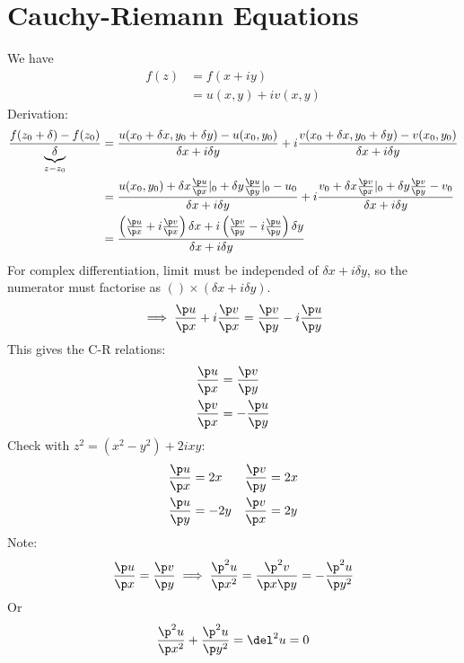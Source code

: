 \documentclass[a4paper, 11pt, normalem]{report}
\begin{document}
\section{Cauchy-Riemann Equations}
We have
\begin{align}
    f(z) &= f(x + iy) \\
         &= u(x,y) + iv(x,y)
\end{align}
Derivation:
\begin{align}
    \frac{f(z_0 + \delta) - f(z_0)}{\underbrace{\delta}_{z - z_0}} &= \frac{u(x_0 + \delta x, y_0 + \delta y) - u(x_0,y_0)}{\delta x + i\delta y} + i\frac{v(x_0 + \delta x, y_0 + \delta y) - v(x_0,y_0)}{\delta x + i\delta y} \\
                                                                   &= \frac{u(x_0,y_0) + \delta x \frac{\p u}{\p x}|_0 + \delta y \frac{\p u}{\p y}|_0 - u_0}{\delta x + i\delta y} + i\frac{v_0 + \delta x \frac{\p v}{\p x}|_0 + \delta y\frac{\p v}{\p y} - v_0}{\delta x + i\delta y} \\
                                                                   &= \frac{\left(\frac{\p u}{\p x} + i\frac{\p v}{\p x}\right)\delta x + i\left(\frac{\p v}{\p y} - i\frac{\p u}{\p y}\right)\delta y}{\delta x + i\delta y}
\end{align}
For complex differentiation, limit must be independed of $\delta x + i\delta y$, so the numerator must factorise as $() \times (\delta x + i\delta y)$.
\begin{equation}
    \implies \frac{\p u}{\p x} + i\frac{\p v}{\p x} = \frac{\p v}{\p y} - i\frac{\p u}{\p y}
\end{equation}
This gives the C-R relations:
\begin{align}
    \frac{\p u}{\p x} &= \frac{\p v}{\p y} \\
    \frac{\p v}{\p x} &= -\frac{\p u}{\p y}
\end{align}
Check with $z^2 = (x^2 - y^2) + 2ixy$:
\begin{align}
    \frac{\p u}{\p x} &= 2x & \frac{\p v}{\p y} &= 2x \\
    \frac{\p u}{\p y} &= -2y & \frac{\p v}{\p x} &= 2y
\end{align}
Note:
\begin{equation}
    \frac{\p u}{\p x} = \frac{\p v}{\p y} \implies \frac{\p^2 u}{\p x^2} = \frac{\p^2 v}{\p x \p y} = -\frac{\p^2 u}{\p y^2}
\end{equation}
Or
\begin{equation}
    \frac{\p^2 u}{\p x^2} + \frac{\p^2 u}{\p y^2} = \del^2 u = 0
\end{equation}
\end{document}
